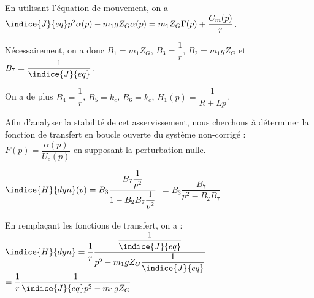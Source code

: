 \ifprof
\begin{corrige}
En utilisant l'équation de mouvement, on a 
$\indice{J}{eq}p^2\alpha(p)-m_{1} g Z_{G} \alpha(p)=m_{1} Z_{G} \Gamma(p)+\dfrac{C_{m}(p)}{r}$.

Nécessairement, on a donc $B_1 = m_{1} Z_{G}$, $B_3 = \dfrac{1}{r}$,  $B_2 =m_{1} g Z_{G}$ et $B_7 = \dfrac{1}{\indice{J}{eq}}$.

On a de plus $B_4 = \dfrac{1}{r}$, $B_5 = k_c$, $B_6 = k_e$,  $H_1(p) = \dfrac{1}{R+Lp}$.
\end{corrige}
\else
\fi

Afin d'analyser la stabilité de cet asservissement, nous cherchons à déterminer la fonction de transfert en boucle ouverte du système non-corrigé : $F(p)=\dfrac{\alpha(p)}{U_{c}(p)}$ en supposant la perturbation nulle.

\ifprof
\begin{corrige}
$\indice{H}{dyn}(p) = B_3 \dfrac{B_7 \dfrac{1}{p^2}}{1- B_2 B_7 \dfrac{1}{p^2}}$ $= B_3 \dfrac{B_7 }{p^2- B_2 B_7 }$

En remplaçant les fonctions de transfert, on a : 
$\indice{H}{dyn} = \dfrac{1}{r} \dfrac{\dfrac{1}{\indice{J}{eq}}}{p^2- m_{1} g Z_{G} \dfrac{1}{\indice{J}{eq}}}$
$= \dfrac{1}{r} \dfrac{1}{\indice{J}{eq}p^2- m_{1} g Z_{G} }$
\end{corrige}
\else
\fi

